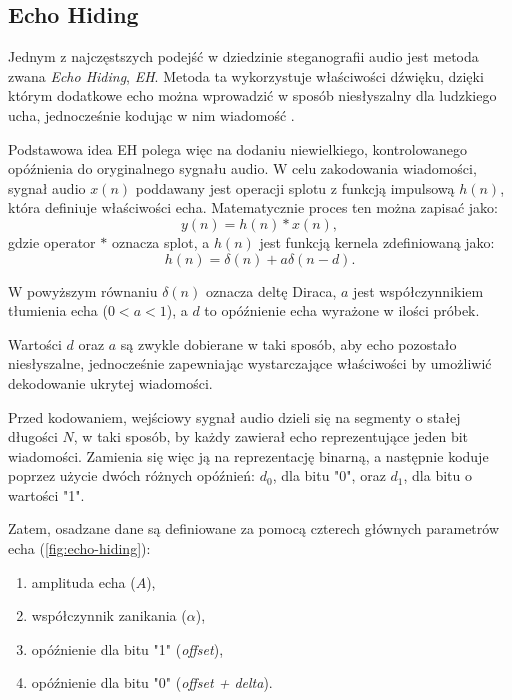 \subsection{Echo Hiding}

Jednym z najczęstszych podejść w dziedzinie steganografii audio jest metoda zwana \textit{Echo Hiding}, \textit{EH}. Metoda ta wykorzystuje właściwości dźwięku, dzięki którym dodatkowe echo można wprowadzić w sposób niesłyszalny dla ludzkiego ucha, jednocześnie kodując w nim wiadomość \cite{Gruhl1996EchoH}.

Podstawowa idea EH polega więc na dodaniu niewielkiego, kontrolowanego opóźnienia do oryginalnego sygnału audio. W celu zakodowania wiadomości, sygnał audio $x(n)$ poddawany jest operacji splotu z funkcją impulsową $h(n)$, która definiuje właściwości echa. Matematycznie proces ten można zapisać jako:
\begin{equation}
	y(n) = h(n) * x(n),
\end{equation}
gdzie operator $*$ oznacza splot, a $h(n)$ jest funkcją kernela zdefiniowaną jako:
\begin{equation}
	h(n) = \delta(n) + a \delta(n-d).
\end{equation}

W powyższym równaniu $\delta(n)$ oznacza deltę Diraca, $a$ jest współczynnikiem tłumienia echa ($0 < a < 1$), a $d$ to opóźnienie echa wyrażone w ilości próbek.

Wartości $d$ oraz $a$ są zwykle dobierane w taki sposób, aby echo pozostało niesłyszalne, jednocześnie zapewniając wystarczające właściwości by umożliwić dekodowanie ukrytej wiadomości.

Przed kodowaniem, wejściowy sygnał audio dzieli się na segmenty o stałej długości $N$, w taki sposób, by każdy zawierał echo reprezentujące jeden bit wiadomości. Zamienia się więc ją na reprezentację binarną, a następnie koduje poprzez użycie dwóch różnych opóźnień: $d_0$, dla bitu "0", oraz $d_1$, dla bitu o wartości "1".

Zatem, osadzane dane są definiowane za pomocą czterech głównych parametrów echa (\ref{fig:echo-hiding}):
\begin{enumerate}
	\item amplituda echa ($A$),
	\item współczynnik zanikania ($\alpha$),
	\item opóźnienie dla bitu "1" (\textit{offset}),
	\item opóźnienie dla bitu "0" (\textit{offset + delta}).
\end{enumerate}

